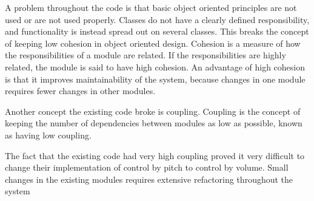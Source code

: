 A problem throughout the code is that basic object oriented principles are not used or are not used properly. 
Classes do not have a clearly defined responsibility, and functionality is instead spread out on several classes. 
This breaks the concept of keeping low cohesion in object oriented design. 
Cohesion is a measure of how the responsibilities of a module are related. 
If the responsibilities are highly related, the module is said to have high cohesion.
An advantage of high cohesion is that it improves maintainability of the system, because changes in one module requires fewer changes in other modules. 

Another concept the existing code broke is coupling.
Coupling is the concept of keeping the number of dependencies between modules as low as possible, known as having low coupling.

The fact that the existing code had very high coupling proved it very difficult to change their implementation of control by pitch to control by volume.
Small changes in the existing modules requires extensive refactoring thr\-oughout the system 
